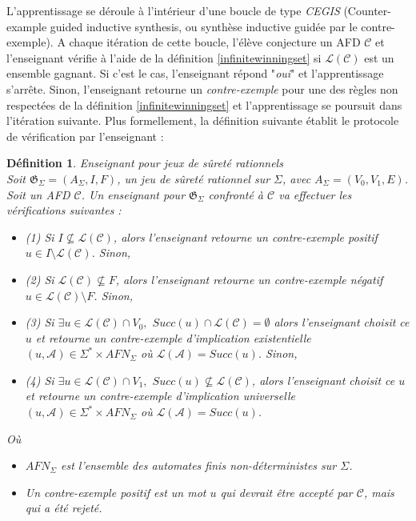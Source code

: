 \documentclass[12pt,a4paper,oneside,titlepage]{report}
\newtheorem{defi}{D\'efinition}[section]
\begin{document}
L'apprentissage se déroule à l'intérieur d'une boucle de type \emph{CEGIS} (Counter-example guided inductive synthesis, ou synthèse inductive guidée par le contre-exemple). A chaque itération de cette boucle, l'élève conjecture un AFD $\mathcal{C}$ et l'enseignant vérifie à l'aide de la définition \ref{infinitewinningset} si $\mathcal{L}(\mathcal{C})$ est un ensemble gagnant. Si c'est le cas, l'enseignant répond "\emph{oui}" et l'apprentissage s'arrête. Sinon, l'enseignant retourne un \emph{contre-exemple} pour une des règles non respectées de la définition \ref{infinitewinningset} et l'apprentissage se poursuit dans l'itération suivante. Plus formellement, la définition suivante établit le protocole de vérification par l'enseignant :
\begin{defi}{Enseignant pour jeux de sûreté rationnels\\}
\label{teacher}
Soit $\mathfrak{G}_\Sigma=(A_\Sigma, I, F)$, un jeu de sûreté rationnel sur $\Sigma$, avec $A_\Sigma=(V_0,V_1,E)$. Soit un AFD $\mathcal{C}$. Un enseignant pour $\mathfrak{G}_\Sigma$ confronté à $\mathcal{C}$ va effectuer les vérifications suivantes :\\
\begin{itemize}
\item (1) Si $I\nsubseteq \mathcal{L}(\mathcal{C})$, alors l'enseignant retourne un \emph{contre-exemple positif} $u\in I\setminus \mathcal{L}(\mathcal{C})$. Sinon,
\item (2) Si $\mathcal{L}(\mathcal{C}) \nsubseteq F$, alors l'enseignant retourne un \emph{contre-exemple négatif} $u\in \mathcal{L}(\mathcal{C})\setminus F$. Sinon, 
\item (3) Si $\exists u\in \mathcal{L}(\mathcal{C})\cap V_0,$ $Succ(u)\cap \mathcal{L}(\mathcal{C})=\emptyset$ alors l'enseignant choisit ce $u$ et retourne un \emph{contre-exemple d'implication existentielle} $(u, \mathcal{A})\in \Sigma^* \times AFN_\Sigma$ où $\mathcal{L}(\mathcal{A})=Succ(u)$. Sinon, 
\item (4) Si $\exists u\in \mathcal{L}(\mathcal{C})\cap V_1,$ $Succ(u)\nsubseteq \mathcal{L}(\mathcal{C})$, alors l'enseignant choisit ce $u$ et retourne un \emph{contre-exemple d'implication universelle} $(u, \mathcal{A})\in \Sigma^* \times AFN_\Sigma$ où $\mathcal{L}(\mathcal{A})=Succ(u)$.
\end{itemize}
Où 
\begin{itemize}
\item $AFN_\Sigma$ est l'ensemble des automates finis non-déterministes sur $\Sigma$.
\item Un \emph{contre-exemple positif} est un mot $u$ qui devrait être accepté par $\mathcal{C}$, mais qui a été rejeté.

\end{itemize}
\end{defi}
\end{document}

